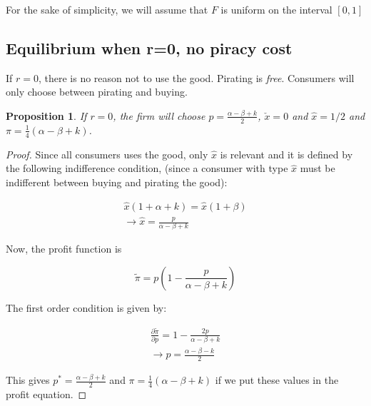 \documentclass[11pt]{article}
\newtheorem{proposition}{Proposition}
\begin{document}
For the sake of simplicity, we will assume that $F$ is uniform on the interval $[0,1]$


\subsection{Equilibrium when r=0, no piracy cost}

If $r=0$, there is no reason not to use the good. Pirating is \textit{free}. Consumers will only choose between pirating and buying. 

\begin{proposition}
If $r=0$, the firm will choose $p=\frac{\alpha-\beta+k}{2}$, $\check{x}=0$ and $\hat{x}=1/2$ and $\pi= \frac{1}{4}(\alpha-\beta+k)$.
\end{proposition}

\begin{proof}

Since all consumers uses the good, only $\hat{x}$ is relevant and it is defined by the following indifference condition, (since a consumer with type $\hat{x}$ must be indifferent between buying and pirating the good):

\begin{align*}
\hat{x}(1+\alpha+k)=\hat{x}(1+\beta) \\
\rightarrow \hat{x} = \frac{p}{\alpha - \beta +k}
\end{align*}


Now, the profit function is

\begin{equation*}
\tilde{\pi} = p\left(1-\frac{p}{\alpha - \beta +k}\right)
\end{equation*}

The first order condition is given by:

\begin{align*}
\frac{\partial \tilde{\pi}}{\partial p}= 1-\frac{2p}{\alpha - \beta +k}\\
\rightarrow p = \frac{\alpha-\beta-k}{2}
\end{align*} 

This gives  $p^*=\frac{\alpha-\beta+k}{2}$ and $\pi=\frac{1}{4}(\alpha-\beta+k)$ if we put these values in the profit equation. 

\end{proof}
\end{document}
